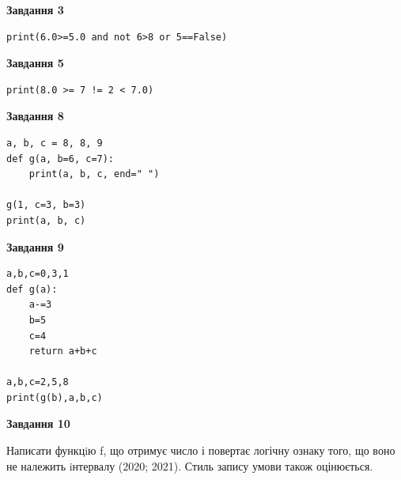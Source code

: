 \documentclass[12pt, ukrainian]{article}
\begin{document}
{\begin {large}
\begin{minipage}[t]{7.5cm}
\end{minipage}
\vline \hspace{6mm}
\begin{minipage}[t]{10.5cm}

\begin{center}
\textbf{Завдання 3}
\end{center}

\begin{verbatim}
print(6.0>=5.0 and not 6>8 or 5==False)
\end{verbatim}



\begin{center}
\textbf{Завдання 5}
\end{center}

\begin{verbatim}
print(8.0 >= 7 != 2 < 7.0)
\end{verbatim}



\begin{center}
\textbf{Завдання 8}
\end{center}

\begin{verbatim}
a, b, c = 8, 8, 9
def g(a, b=6, c=7):
    print(a, b, c, end=" ")

g(1, c=3, b=3)
print(a, b, c)
\end{verbatim}



\begin{center}
\textbf{Завдання 9}
\end{center}

\begin{verbatim}
a,b,c=0,3,1
def g(a):
    a-=3
    b=5
    c=4
    return a+b+c

a,b,c=2,5,8
print(g(b),a,b,c)
\end{verbatim}



\begin{center}
\textbf{Завдання 10}
\end{center}

Написати функцiю f, що отримує число і повертає логічну ознаку того, що воно не належить iнтервалу (2020; 2021). Стиль запису умови також оцінюється.\par

\end{minipage}

\end {large}}
\newpage
\end{document}
